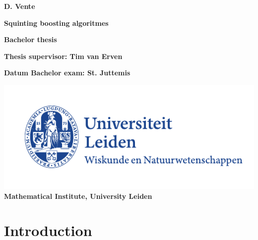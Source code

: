\documentclass[a4paper,dutch,reqno]{article}
\theoremstyle{plain}
\theoremstyle{definition}
\begin{document}
\vspace*{7em}
\begin{center}
{\large\bf D. Vente\par} \vspace{3em} {\LARGE\bf Squinting boosting algoritmes\par} \vspace{3em} {\large\bf
Bachelor thesis\par} \vspace{1em} {\large\bf Thesis supervisor:
Tim van Erven\par} \vspace{3em} {\large\bf Datum
Bachelor exam: St. Juttemis\par}\vfill
\includegraphics{uniLogo}\\
\vspace{2em}
{\large\bf Mathematical Institute, University Leiden}
\end{center}

\thispagestyle{empty} %

\newpage
\tableofcontents
\newpage

\section{Introduction}
\label{intro}
\cite{Freund1997}



\end{document}
